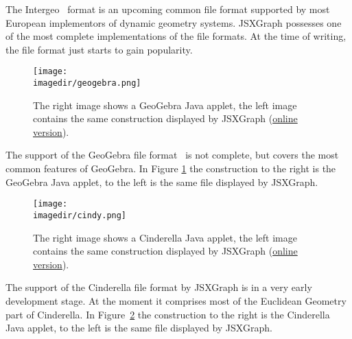 \documentclass[12pt,a4paper]{article}%
\newcommand{\imagedir}{pics}
\begin{document}
The Intergeo~\cite{kortenkamp2009} format is an upcoming common file format supported 
by most European implementors of dynamic geometry systems. 
JSXGraph possesses one of the most complete implementations of the file formats. 
At the time of writing, the file format just starts to gain popularity. 

\begin{figure}[ht]
\begin{center}
\texttt{[image: \\imagedir/geogebra.png]}\\
\caption{The right image shows a GeoGebra Java applet, 
the left image contains the same construction displayed 
by JSXGraph
(\href{http://jsxgraph.uni-bayreuth.de/talks/cadgme10/talk/jsx_ggb.html}{online version}).}\label{fig:geogebra}
\end{center}
\end{figure}
The support of the GeoGebra file format~\cite{hohenwarter2005} is not complete, 
but covers the most common features of GeoGebra. 
In Figure \ref{fig:geogebra} the construction to the right is the GeoGebra Java applet, 
to the left is the same file displayed by JSXGraph.


\begin{figure}[ht]
\begin{center}
\texttt{[image: \\imagedir/cindy.png]}\\
\caption{The right image shows a Cinderella Java applet, 
the left image contains the same construction displayed 
by JSXGraph 
(\href{http://jsxgraph.uni-bayreuth.de/talks/cadgme10/talk/jsx_cdy.html}{online version}).}\label{fig:cindy}
\end{center}
\end{figure}
The support of the Cinderella file format \cite{kortenkamp1999} by JSXGraph is in a very early development stage. At the moment it comprises most of the Euclidean Geometry part of Cinderella. In Figure~\ref{fig:cindy} the construction to the right is the Cinderella Java applet, to the left is the same file displayed by JSXGraph.
\end{document}
